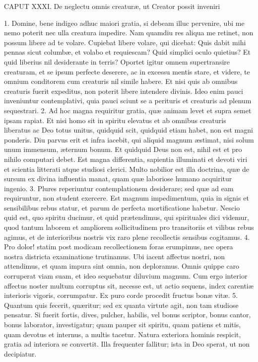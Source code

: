 \documentclass[twoside]{article}
\begin{document}
CAPUT XXXI.
De neglectu omnis creaturæ, ut Creator possit inveniri

1. Domine, bene indigeo adhuc maiori gratia, si debeam illuc pervenire, ubi me nemo poterit nec ulla creatura impedire. Nam quamdiu res aliqua me retinet, non possum libere ad te volare. Cupiebat libere volare, qui dicebat: Quis dabit mihi pennas sicut columbæ, et volabo et requiescam? Quid simplici oculo quietius? Et quid liberius nil desiderante in terris? Oportet igitur omnem supertransire creaturam, et se ipsum perfecte deserere, ac in excessu mentis stare, et videre, te omnium conditorem cum creaturis nil simile habere. Et nisi quis ab omnibus creaturis fuerit expeditus, non poterit libere intendere divinis. Ideo enim pauci inveniuntur contemplativi, quia pauci sciunt se a perituris et creaturis ad plenum sequestrari.
2. Ad hoc magna requiritur gratia, quæ animam levet et supra semet ipsam rapiat. Et nisi homo sit in spiritu elevatus et ab omnibus creaturis liberatus ac Deo totus unitus, quidquid scit, quidquid etiam habet, non est magni ponderis. Diu parvus erit et infra iacebit, qui aliquid magnum æstimat, nisi solum unum immensum, æternum bonum. Et quidquid Deus non est, nihil est et pro nihilo computari debet. Est magna differentia, sapientia illuminati et devoti viri et scientia litterati atque studiosi clerici. Multo nobilior est illa doctrina, quæ de sursum ex divina influentia manat, quam quæ laboriose humano acquiritur ingenio.
3. Plures reperiuntur contemplationem desiderare; sed quæ ad eam requiruntur, non student exercere. Est magnum impedimentum, quia in signis et sensibilibus rebus statur, et parum de perfecta mortificatione habetur. Nescio quid est, quo spiritu ducimur, et quid prætendimus, qui spirituales dici videmur, quod tantum laborem et ampliorem sollicitudinem pro transitoriis et vilibus rebus agimus, et de interioribus nostris vix raro plene recollectis sensibus cogitamus.
4. Pro dolor! statim post modicam recollectionem foras erumpimus, nec opera nostra districta examinatione trutinamus. Ubi iacent affectus nostri, non attendimus, et quam impura sint omnia, non deploramus. Omnis quippe caro corruperat viam suam, et ideo sequebatur diluvium magnum. Cum ergo interior affectus noster multum corruptus sit, necesse est, ut actio sequens, index carentiæ interioris vigoris, corrumpatur. Ex puro corde procedit fructus bonæ vitæ.
5. Quantum quis fecerit, quæritur; sed ex quanta virtute agit, non tam studiose pensatur. Si fuerit fortis, dives, pulcher, habilis, vel bonus scriptor, bonus cantor, bonus laborator, investigatur; quam pauper sit spiritu, quam patiens et mitis, quam devotus et internus, a multis tacetur. Natura exteriora hominis respicit, gratia ad interiora se convertit. Illa frequenter fallitur; ista in Deo sperat, ut non decipiatur.
\end{document}
